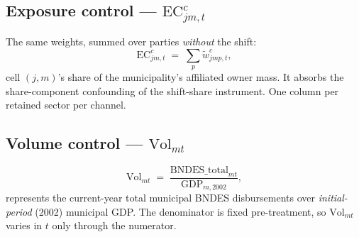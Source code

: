 \documentclass{article}
\newcommand{\EC}{\mathrm{EC}}
\newcommand{\Vol}{\mathrm{Vol}}
\begin{document}
\subsection*{Exposure control --- $\EC^{c}_{jm,t}$}
The same weights, summed over parties \emph{without} the shift:
\[
  \EC^{c}_{jm,t}\;=\;\sum_{p}\tilde w^{c}_{jmp,t},
\]
cell $(j,m)$'s share of the municipality's affiliated owner mass. It absorbs
the share-component confounding of the shift-share instrument. One column per retained sector per
channel.

\subsection*{Volume control --- $\Vol_{mt}$}
\[
  \Vol_{mt}
  \;=\;
  \frac{\mathrm{BNDES\_total}_{mt}}{\mathrm{GDP}_{m,2002}},
\]
represents the current-year total municipal BNDES disbursements over \emph{initial-period}
(2002) municipal GDP. The denominator is fixed pre-treatment, so $\Vol_{mt}$
varies in $t$ only through the numerator.
\end{document}
